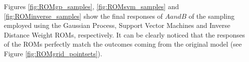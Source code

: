 Figures \ref{fig:ROMgp_samples}, \ref{fig:ROMsvm_samples} and \ref{fig:ROMinverse_samples}  show the final responses  of $A and B$ of the sampling employed using the Gaussian Process, Support Vector Machines and Inverse Distance Weight ROMs, respectively.
It can be clearly noticed that the responses of the ROMs perfectly match the outcomes coming from the original model (see Figure   \ref{fig:ROMgrid_pointsets}).








